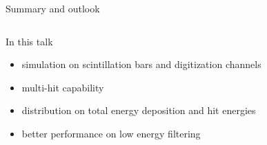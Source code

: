 \documentclass[compress, 13pt, aspectratio=169]{beamer}
\begin{document}
\begin{frame}{Summary and outlook}
    \begin{columns}
        \begin{column}{0.5\textwidth}
            \begin{block}{In this talk}
                \begin{itemize}
                    \item simulation on scintillation bars and digitization channels
                    \item multi-hit capability
                    \item distribution on total energy deposition and hit energies
                    \item better performance on low energy filtering
                \end{itemize}
            \end{block}


\end{column}
\end{columns}
\end{frame}
\end{document}
